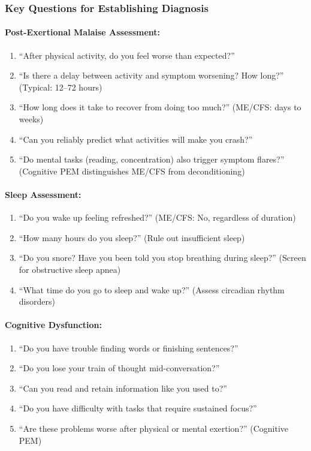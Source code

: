 \subsubsection{Key Questions for Establishing Diagnosis}

\paragraph{Post-Exertional Malaise Assessment:}
\begin{enumerate}
    \item ``After physical activity, do you feel worse than expected?''
    \item ``Is there a delay between activity and symptom worsening? How long?'' (Typical: 12--72 hours)
    \item ``How long does it take to recover from doing too much?'' (ME/CFS: days to weeks)
    \item ``Can you reliably predict what activities will make you crash?''
    \item ``Do mental tasks (reading, concentration) also trigger symptom flares?'' (Cognitive PEM distinguishes ME/CFS from deconditioning)
\end{enumerate}

\paragraph{Sleep Assessment:}
\begin{enumerate}
    \item ``Do you wake up feeling refreshed?'' (ME/CFS: No, regardless of duration)
    \item ``How many hours do you sleep?'' (Rule out insufficient sleep)
    \item ``Do you snore? Have you been told you stop breathing during sleep?'' (Screen for obstructive sleep apnea)
    \item ``What time do you go to sleep and wake up?'' (Assess circadian rhythm disorders)
\end{enumerate}

\paragraph{Cognitive Dysfunction:}
\begin{enumerate}
    \item ``Do you have trouble finding words or finishing sentences?''
    \item ``Do you lose your train of thought mid-conversation?''
    \item ``Can you read and retain information like you used to?''
    \item ``Do you have difficulty with tasks that require sustained focus?''
    \item ``Are these problems worse after physical or mental exertion?'' (Cognitive PEM)
\end{enumerate}

